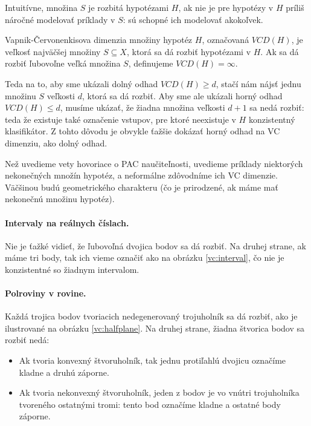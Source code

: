 Intuitívne, množina $S$ je rozbitá hypotézami $H$, ak nie je pre
hypotézy v $H$ príliš náročné modelovať príklady v $S$: sú schopné
ich modelovať akokoľvek.

\begin{definition}
  Vapnik-Červonenkisova dimenzia množiny hypotéz $H$, označovaná
  $VCD(H)$, je veľkosť najväčšej množiny $S \subseteq X$, ktorá
  sa dá rozbiť hypotézami v $H$. Ak sa dá rozbiť ľubovoľne veľká
  množina $S$, definujeme $VCD(H) = \infty$.
\end{definition}

Teda na to, aby sme ukázali dolný odhad $VCD(H) \geq d$, stačí nám
nájsť jednu množinu $S$ veľkosti $d$, ktorá sa dá rozbiť. Aby sme ale
ukázali horný odhad $VCD(H) \leq d$, musíme ukázať, že žiadna množina
veľkosti $d + 1$ sa nedá rozbiť: teda že existuje také označenie vstupov,
pre ktoré neexistuje v $H$ konzistentný klasifikátor. Z tohto dôvodu je
obvykle ťažšie dokázať horný odhad na VC dimenziu, ako dolný odhad.

Než uvedieme vety hovoriace o PAC naučiteľnosti, uvedieme príklady
niektorých nekonečných množín hypotéz, a neformálne zdôvodníme ich
VC dimenzie. Väčšinou budú geometrického charakteru (čo je prirodzené,
ak máme mať nekonečnú množinu hypotéz).

\paragraph{Intervaly na reálnych číslach.} Nie je ťažké vidieť, že
ľubovoľná dvojica bodov sa dá rozbiť. Na druhej strane, ak máme tri
body, tak ich vieme označiť ako na obrázku \ref{vc:interval}, čo nie
je konzistentné so žiadnym intervalom.

\paragraph{Polroviny v rovine.} Každá trojica bodov tvoriacich
nedegenerovaný trojuholník sa dá rozbiť, ako je ilustrované na
obrázku \ref{vc:halfplane}. Na druhej strane, žiadna štvorica bodov
sa rozbiť nedá:
\begin{itemize}
  \item Ak tvoria konvexný štvoruholník, tak jednu protiľahlú dvojicu
    označíme kladne a druhú záporne.
  \item Ak tvoria nekonvexný štvoruholník, jeden z bodov je vo vnútri
    trojuholníka tvoreného ostatnými tromi: tento bod označíme kladne
    a ostatné body záporne.
\end{itemize}

